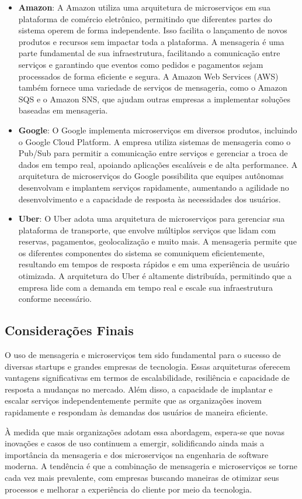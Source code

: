 \begin{itemize}
    \item \textbf{Amazon}: A Amazon utiliza uma arquitetura de microserviços em sua plataforma de comércio eletrônico, permitindo que diferentes partes do sistema operem de forma independente. Isso facilita o lançamento de novos produtos e recursos sem impactar toda a plataforma. A mensageria é uma parte fundamental de sua infraestrutura, facilitando a comunicação entre serviços e garantindo que eventos como pedidos e pagamentos sejam processados de forma eficiente e segura. A Amazon Web Services (AWS) também fornece uma variedade de serviços de mensageria, como o Amazon SQS e o Amazon SNS, que ajudam outras empresas a implementar soluções baseadas em mensageria.

    \item \textbf{Google}: O Google implementa microserviços em diversos produtos, incluindo o Google Cloud Platform. A empresa utiliza sistemas de mensageria como o Pub/Sub para permitir a comunicação entre serviços e gerenciar a troca de dados em tempo real, apoiando aplicações escaláveis e de alta performance. A arquitetura de microserviços do Google possibilita que equipes autônomas desenvolvam e implantem serviços rapidamente, aumentando a agilidade no desenvolvimento e a capacidade de resposta às necessidades dos usuários.

    \item \textbf{Uber}: O Uber adota uma arquitetura de microserviços para gerenciar sua plataforma de transporte, que envolve múltiplos serviços que lidam com reservas, pagamentos, geolocalização e muito mais. A mensageria permite que os diferentes componentes do sistema se comuniquem eficientemente, resultando em tempos de resposta rápidos e em uma experiência de usuário otimizada. A arquitetura do Uber é altamente distribuída, permitindo que a empresa lide com a demanda em tempo real e escale sua infraestrutura conforme necessário.
\end{itemize}

\subsection{Considerações Finais}
O uso de mensageria e microserviços tem sido fundamental para o sucesso de diversas startups e grandes empresas de tecnologia. Essas arquiteturas oferecem vantagens significativas em termos de escalabilidade, resiliência e capacidade de resposta a mudanças no mercado. Além disso, a capacidade de implantar e escalar serviços independentemente permite que as organizações inovem rapidamente e respondam às demandas dos usuários de maneira eficiente.

À medida que mais organizações adotam essa abordagem, espera-se que novas inovações e casos de uso continuem a emergir, solidificando ainda mais a importância da mensageria e dos microserviços na engenharia de software moderna. A tendência é que a combinação de mensageria e microserviços se torne cada vez mais prevalente, com empresas buscando maneiras de otimizar seus processos e melhorar a experiência do cliente por meio da tecnologia.
